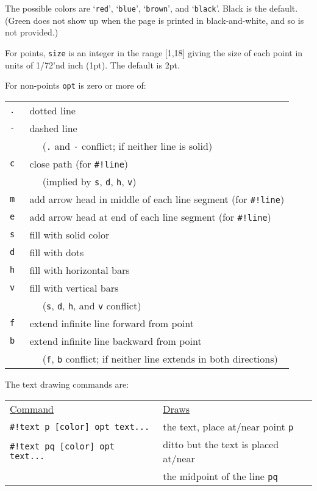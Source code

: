 \documentclass[12pt]{article}
\begin{document}
The possible colors
are `{\tt red}', `{\tt blue}', `{\tt brown}', and `{\tt black}'.  Black is
the default.
(Green does not show up when the page is printed in black-and-white, and
so is not provided.)

For points, {\tt size} is an integer in the range [1,18] giving the size
of each point in units of 1/72'nd inch (1pt).  The default is 2pt.

\begin{minipage}{\textwidth}
For non-points {\tt opt} is zero or more of:
\\[1ex]
\hspace*{0.5in}\begin{tabular}{rl}
    \tt . & dotted line \\
    \tt - & dashed line \\
          & ~~ ({\tt .} and {\tt -} conflict; if neither line is solid) \\
    \tt c & close path (for {\tt \#!line}) \\
          & ~~ (implied by {\tt s}, {\tt d}, {\tt h}, {\tt v}) \\
    \tt m & add arrow head in middle of each line segment (for {\tt \#!line}) \\
    \tt e & add arrow head at end of each line segment (for {\tt \#!line}) \\
    \tt s & fill with solid color \\
    \tt d & fill with dots \\
    \tt h & fill with horizontal bars \\
    \tt v & fill with vertical bars \\
          & ~~ ({\tt s}, {\tt d}, {\tt h}, and {\tt v} conflict) \\
    \tt f & extend infinite line forward from point \\
    \tt b & extend infinite line backward from point \\
          & ~~ ({\tt f}, {\tt b} conflict; if neither
	        line extends in both directions) \\
    \end{tabular}
\end{minipage}

\begin{minipage}{\textwidth}
The text drawing commands are:
\\[1ex]
\begin{tabular}{@{}l@{~~~~~}l@{}}
\underline{Command} & \underline{Draws}
\\[1ex]
\tt \#!text p [color] opt text... &
    the text, place at/near point {\tt p} \\
\tt \#!text pq [color] opt text... &
    ditto but the text is placed at/near \\
    & the midpoint of the line {\tt pq}
\end{tabular}
\end{minipage}
\end{document}

